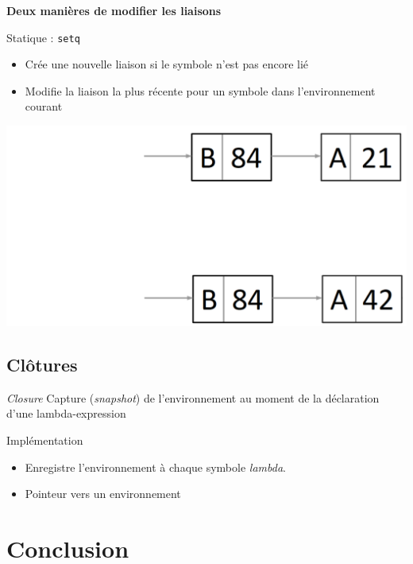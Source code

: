 \documentclass[info]{ensrennesbeamer}
\begin{document}
\begin{frame}
	\textbf{Deux manières de modifier les liaisons}
		\begin{block}{Statique : \lstinline[][setq[}
			\begin{itemize}
				\item Crée une nouvelle liaison si le symbole n'est pas encore lié
				\item Modifie la liaison la plus récente pour un symbole dans l'environnement courant
			\end{itemize}
		\end{block}
	\centering
	\includegraphics[height=0.5\textheight]{liaisons_dynamiques.png}
		
\end{frame}


\subsection{Clôtures}
\begin{frame}
	\begin{block}{\emph{Closure}}
		Capture (\emph{snapshot}) de l'environnement au moment de la déclaration d'une lambda-expression
	\end{block}
	\begin{block}{Implémentation}
		\begin{itemize}
			\item Enregistre l'environnement à chaque symbole \emph{lambda}.
			\item Pointeur vers un environnement
		\end{itemize}
	\end{block}
	
\end{frame}

\section{Conclusion}
\end{document}
